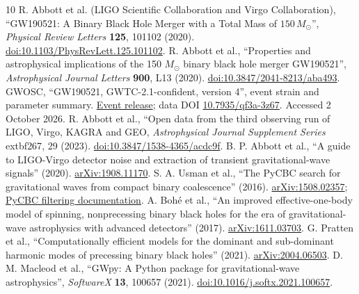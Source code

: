 \documentclass[11pt,a4paper]{article}
\begin{document}
\begin{thebibliography}{10}\small
{} R. Abbott et al. (LIGO Scientific Collaboration and Virgo Collaboration), ``GW190521: A Binary Black Hole Merger with a Total Mass of $150\,M_\odot$'', \emph{Physical Review Letters} \textbf{125}, 101102 (2020). \href{https://doi.org/10.1103/PhysRevLett.125.101102}{doi:10.1103/PhysRevLett.125.101102}.
 R. Abbott et al., ``Properties and astrophysical implications of the 150 $M_\odot$ binary black hole merger GW190521'', \emph{Astrophysical Journal Letters} \textbf{900}, L13 (2020). \href{https://doi.org/10.3847/2041-8213/aba493}{doi:10.3847/2041-8213/aba493}.
 GWOSC, ``GW190521, GWTC-2.1-confident, version 4'', event strain and parameter summary. \href{https://gwosc.org/eventapi/html/GWTC-2.1-confident/GW190521/v4/}{Event release}; data DOI \href{https://doi.org/10.7935/qf3a-3z67}{10.7935/qf3a-3z67}. Accessed 2 October 2026.
 R. Abbott et al., ``Open data from the third observing run of LIGO, Virgo, KAGRA and GEO, \emph{Astrophysical Journal Supplement Series} 	extbf{267}, 29 (2023). \href{https://doi.org/10.3847/1538-4365/acdc9f}{doi:10.3847/1538-4365/acdc9f}.
 B. P. Abbott et al., ``A guide to LIGO-Virgo detector noise and extraction of transient gravitational-wave signals'' (2020). \href{https://arxiv.org/abs/1908.11170}{arXiv:1908.11170}.
 S. A. Usman et al., ``The PyCBC search for gravitational waves from compact binary coalescence'' (2016). \href{https://arxiv.org/abs/1508.02357}{arXiv:1508.02357}; \href{https://pycbc.org/pycbc/latest/html/pycbc.filter.html}{PyCBC filtering documentation}.
 A. Boh\'e et al., ``An improved effective-one-body model of spinning, nonprecessing binary black holes for the era of gravitational-wave astrophysics with advanced detectors'' (2017). \href{https://arxiv.org/abs/1611.03703}{arXiv:1611.03703}.
 G. Pratten et al., ``Computationally efficient models for the dominant and sub-dominant harmonic modes of precessing binary black holes'' (2021). \href{https://arxiv.org/abs/2004.06503}{arXiv:2004.06503}.
 D. M. Macleod et al., ``GWpy: A Python package for gravitational-wave astrophysics'', \emph{SoftwareX} \textbf{13}, 100657 (2021). \href{https://doi.org/10.1016/j.softx.2021.100657}{doi:10.1016/j.softx.2021.100657}.
\end{thebibliography}
\end{document}

